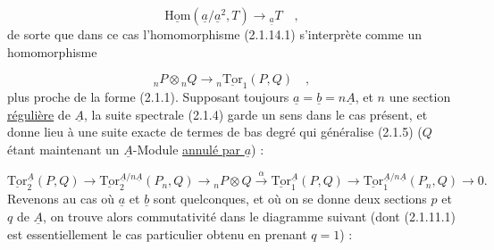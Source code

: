 
\begin{equation*}
 \underline{\mathrm{Hom}}(\underline{a}/\underline{a}^2 , T) \longrightarrow {}_{\underline{a}}T \quad ,
\end{equation*}
de sorte que dans ce cas l'homomorphisme (2.1.14.1) s'interprète comme un homomorphisme

\begin{equation}\tag{2.1.14.4}
{}_nP \otimes {}_nQ \longrightarrow {}_n\underline{\mathrm{Tor}}_1(P,Q) \quad ,
\end{equation}
plus proche de la forme (2.1.1). Supposant toujours $\underline{a} = \underline{b} = n\underline{A}$, et $n$ une section \underline{régulière} de $\underline{A}$, la suite spectrale (2.1.4) garde un sens dans le cas présent, et donne lieu à une suite exacte de termes de bas degré qui généralise (2.1.5) ($Q$ étant maintenant un $\underline{A}$-Module \underline{annulé par $\underline{a}$}) :

\begin{equation}\tag{2.1.14.5}
\underline{\mathrm{Tor}}_2^{\underline{A}}(P,Q) \longrightarrow \underline{\mathrm{Tor}}_2^{\underline{A}/n\underline{A}}(P_n,Q) \longrightarrow {}_nP \otimes Q \xrightarrow{\ \alpha\ } \underline{\mathrm{Tor}}_1^{\underline{A}}(P,Q) \longrightarrow \underline{\mathrm{Tor}}_1^{\underline{A}/n\underline{A}}(P_n,Q) \longrightarrow 0.
\end{equation}
Revenons au cas où $\underline{a}$ et $\underline{b}$ sont quelconques, et où on se donne deux sections $p$ et $q$ de $\underline{A}$, on trouve alors commutativité dans le diagramme suivant (dont (2.1.11.1) est essentiellement le cas particulier obtenu en prenant $q=1$) :

